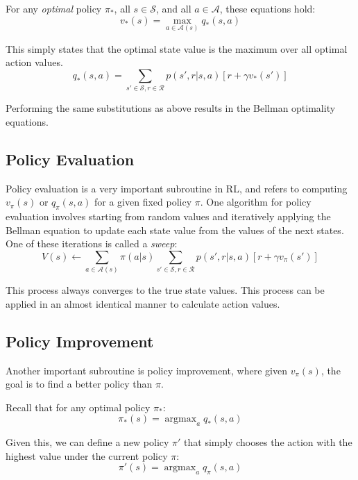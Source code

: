 \documentclass{article}
\DeclareMathOperator*{\argmax}{argmax}
\begin{document}
For any \emph{optimal} policy $\pi_*$, all $s \in \mathcal{S}$, and all $a \in \mathcal{A}$, these equations hold:
\begin{equation}
  v_*(s) = \max_{a \in \mathcal{A}(s)} q_*(s,a)
\end{equation}

This simply states that the optimal state value is the maximum over all optimal action values.
\begin{equation}
  q_*(s,a) = \sum_{s' \in \mathcal{S}, r \in \mathcal{R}} p(s',r|s,a)[r + \gamma v_*(s')]
\end{equation}

Performing the same substitutions as above results in the Bellman optimality equations.

\subsection{Policy Evaluation}
Policy evaluation is a very important subroutine in RL, and refers to computing $v_\pi(s)$ or $q_\pi(s,a)$ for a given fixed policy $\pi$.
One algorithm for policy evaluation involves starting from random values and iteratively applying the Bellman equation to update each state value from the values of
the next states. One of these iterations is called a \emph{sweep}:
\begin{equation}
  V(s) \leftarrow \sum_{a \in \mathcal{A}(s)} \pi(a|s) \sum_{s' \in \mathcal{S}, r \in \mathcal{R}} p(s',r|s,a)[r + \gamma v_\pi(s')]
\end{equation}

This process always converges to the true state values. This process can be applied in an almost identical manner to calculate action values.

\subsection{Policy Improvement}
Another important subroutine is policy improvement, where given $v_\pi(s)$, the goal is to find a better policy than $\pi$.

Recall that for any optimal policy $\pi_*$:
\begin{equation}
  \pi_*(s) = \argmax_a q_*(s,a)
\end{equation}

Given this, we can define a new policy $\pi'$ that simply chooses the action with the highest value under the current policy $\pi$:
\begin{equation}
  \pi'(s) = \argmax_a q_\pi(s,a)
\end{equation}
\end{document}
